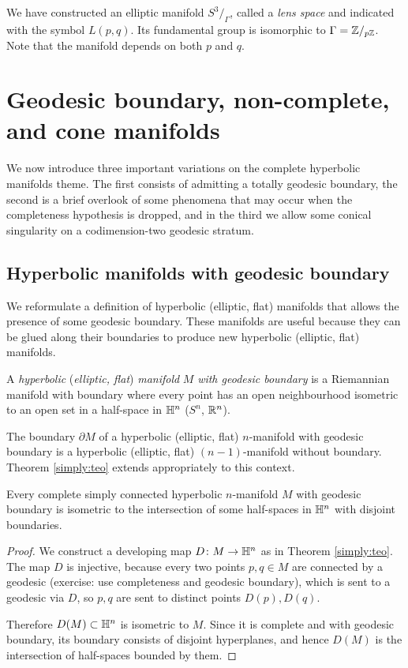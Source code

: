 We have constructed an elliptic manifold $S^3/_\Gamma$, called a \emph{lens space} and indicated with the symbol $L(p,q)$. Its fundamental group is isomorphic to $\Gamma = \mathbb{Z}/_{p\mathbb{Z}}$. Note that the manifold depends on both $p$ and $q$.

\section{Geodesic boundary, non-complete, and cone manifolds}
We now introduce three important variations on the complete hyperbolic manifolds theme.
The first consists of admitting a totally geodesic boundary, the second is a brief overlook of some phenomena that may occur when the completeness hypothesis is dropped, and in the third we allow some conical singularity on a codimension-two geodesic stratum.

\subsection{Hyperbolic manifolds with geodesic boundary}
We reformulate a definition of hyperbolic (elliptic, flat) manifolds that allows the presence of some geodesic boundary. These manifolds are useful because they can be glued along their boundaries to produce new hyperbolic (elliptic, flat) manifolds.
\begin{defn} A \emph{hyperbolic} (\emph{elliptic, flat}) \emph{manifold} $M$ \emph{with geodesic boundary}
is a Riemannian manifold with boundary where every point has an open neighbourhood isometric to an open set in a half-space in $\mathbb{H}^n$ ($S^n$, $\mathbb{R}^n$).
\end{defn}

The boundary $\partial M$ of a hyperbolic (elliptic, flat) $n$-manifold with geodesic boundary is a hyperbolic (elliptic, flat) $(n-1)$-manifold without boundary. Theorem \ref{simply:teo} extends appropriately to this context.

\begin{teo}
Every complete simply connected hyperbolic $n$-manifold $M$ with geodesic boundary is isometric to the intersection of some half-spaces in $\mathbb{H}^n$ with disjoint boundaries.
\end{teo}
\begin{proof}
We construct a developing map $D\colon M\to\mathbb{H}^n$ as in Theorem \ref{simply:teo}. The map $D$ is injective, because every two points $p,q \in M$ are connected by a geodesic (exercise: use completeness and geodesic boundary), which is sent to a geodesic via $D$, so $p,q$ are sent to distinct points $D(p), D(q)$. 

Therefore $D(M)\subset \mathbb{H}^n$ is isometric to $M$. Since it is complete and with geodesic boundary, its boundary consists of disjoint hyperplanes, and hence $D(M)$ is the intersection of half-spaces bounded by them.  
\end{proof}

